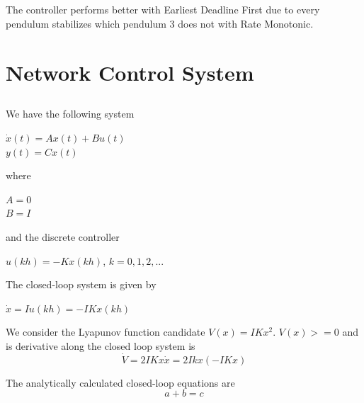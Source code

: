 \documentclass[12pt,a4paper]{article}
\begin{document}
\subsection{}
The controller performs better with Earliest Deadline First due to every pendulum stabilizes which pendulum 3 does not with Rate Monotonic. 

\section{Network Control System}
\subsection{} %
We have the following system
\begin{center}

$\dot{x}(t) = Ax(t)+Bu(t)$ \\
$y(t) = Cx(t)$
\end{center}
where
\begin{center}
$A=0$ \\
$B=I$
\end{center}
and the discrete controller
\begin{center}
$u(kh) = -Kx(kh)$,    $k = 0,1,2,...$
\end{center}

The closed-loop system is given by
\begin{center}
$\dot{x} = Iu(kh)= -IKx(kh)$
\end{center}
We consider the Lyapunov function candidate $V(x)=IKx^2$. $V(x) >=0$ and is derivative along the closed loop system is
\begin{equation}
\dot{V}=2IKx\dot{x}=2Ikx(-IKx)
\end{equation}

The analytically calculated closed-loop equations are
\begin{equation}
a+b=c
\end{equation}
\end{document}
